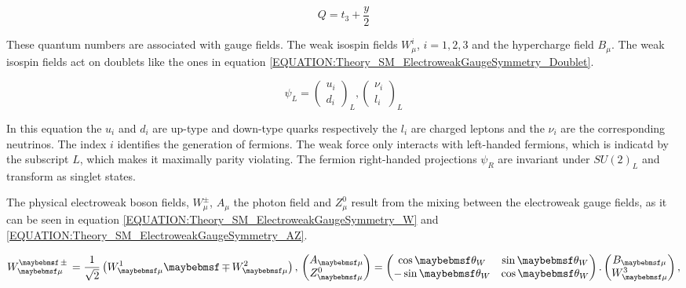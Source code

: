 \begin{equation}
Q = t_{3} + \frac{y}{2}
\label{EQUATION:Theory_SM_ElectroweakGaugeSymmetry_ElecCharge}
\end{equation}

These quantum numbers are associated with gauge fields. The weak isospin fields $W_{\mu}^{i}$, $i = 1,2,3$ and the hypercharge field $B_{\mu}$. The weak isospin fields act on doublets like the ones in equation \ref{EQUATION:Theory_SM_ElectroweakGaugeSymmetry_Doublet}.
 
\begin{equation}
\psi_{L} =  \begin{pmatrix} u_{i} \\ d_{i} \end{pmatrix}_{L} ,   
\begin{pmatrix} \nu_{i} \\ {l_{i}} \end{pmatrix}_{L}
\label{EQUATION:Theory_SM_ElectroweakGaugeSymmetry_Doublet}
\end{equation}

In this equation the $u_{i}$ and $d_{i}$ are up-type and down-type quarks respectively the $l_{i}$ are charged leptons and the $\nu_{i}$ are the corresponding neutrinos. The index $i$ identifies the generation of fermions. The weak force only interacts with left-handed fermions, which is indicatd by the subscript $L$, which makes it maximally parity violating. The fermion right-handed projections $\psi_{R}$ are invariant under $SU(2)_{L}$ and transform as singlet states.
 
The physical electroweak boson fields, $W_{\mu}^{\pm}$, $A_{\mu}$ the photon field and $Z_{\mu}^{0}$ result from the mixing between the electroweak gauge fields, as it can be seen in equation \ref{EQUATION:Theory_SM_ElectroweakGaugeSymmetry_W} and \ref{EQUATION:Theory_SM_ElectroweakGaugeSymmetry_AZ}.


\begin{equation}
W_{\mu}^{\pm} = \frac{1}{\sqrt{2}}\left(W_{\mu}^{1} \mp W_{\mu}^{2}\right) ,\label{EQUATION:Theory_SM_ElectroweakGaugeSymmetry_W}\\
\begin{pmatrix} A_{\mu} \\ Z_{\mu}^{0} \end{pmatrix} = 
\begin{pmatrix} \cos{\theta_{W}} & \sin{\theta_{W}} \\ -\sin{\theta_{W}} &
\cos{\theta_{W}} \end{pmatrix} . 
\begin{pmatrix} B_{\mu} \\ W_{\mu}^{3} \end{pmatrix} ,
\label{EQUATION:Theory_SM_ElectroweakGaugeSymmetry_AZ}
\end{equation}


